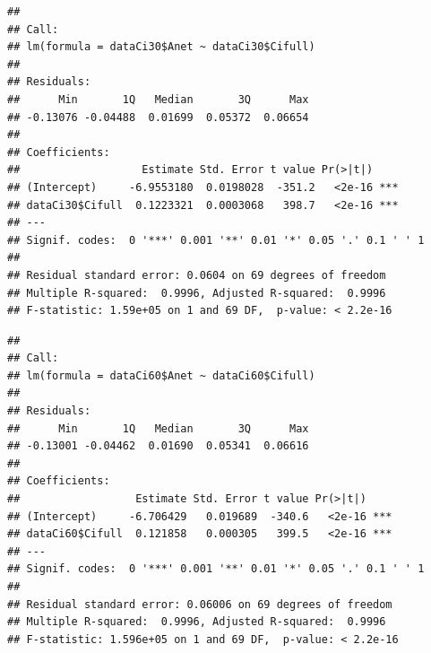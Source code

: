 \documentclass[
]{krantz}
\makeatletter
\newenvironment{Shaded}{\begin{snugshade}}{\end{snugshade}}
\newcommand{\CommentTok}[1]{\textcolor[rgb]{0.56,0.35,0.01}{\textit{#1}}}
\newcommand{\DecValTok}[1]{\textcolor[rgb]{0.00,0.00,0.81}{#1}}
\newcommand{\FunctionTok}[1]{\textcolor[rgb]{0.00,0.00,0.00}{#1}}
\newcommand{\NormalTok}[1]{#1}
\newcommand{\OtherTok}[1]{\textcolor[rgb]{0.56,0.35,0.01}{#1}}
\newcommand{\SpecialCharTok}[1]{\textcolor[rgb]{0.00,0.00,0.00}{#1}}
\newenvironment{kframe}{%
\medskip{}
\setlength{\fboxsep}{.8em}
 \def\at@end@of@kframe{}%
 \ifinner\ifhmode%
  \def\at@end@of@kframe{\end{minipage}}%
  \begin{minipage}{\columnwidth}%
 \fi\fi%
 \def\FrameCommand##1{\hskip\@totalleftmargin \hskip-\fboxsep
 \colorbox{shadecolor}{##1}\hskip-\fboxsep
     \hskip-\linewidth \hskip-\@totalleftmargin \hskip\columnwidth}%
 \MakeFramed {\advance\hsize-\width
   \@totalleftmargin\z@ \linewidth\hsize
   \@setminipage}}%
 {\par\unskip\endMakeFramed%
 \at@end@of@kframe}
\renewenvironment{Shaded}{\begin{kframe}}{\end{kframe}}
\makeatother
\begin{document}
\begin{verbatim}
## 
## Call:
## lm(formula = dataCi30$Anet ~ dataCi30$Cifull)
## 
## Residuals:
##      Min       1Q   Median       3Q      Max 
## -0.13076 -0.04488  0.01699  0.05372  0.06654 
## 
## Coefficients:
##                   Estimate Std. Error t value Pr(>|t|)    
## (Intercept)     -6.9553180  0.0198028  -351.2   <2e-16 ***
## dataCi30$Cifull  0.1223321  0.0003068   398.7   <2e-16 ***
## ---
## Signif. codes:  0 '***' 0.001 '**' 0.01 '*' 0.05 '.' 0.1 ' ' 1
## 
## Residual standard error: 0.0604 on 69 degrees of freedom
## Multiple R-squared:  0.9996, Adjusted R-squared:  0.9996 
## F-statistic: 1.59e+05 on 1 and 69 DF,  p-value: < 2.2e-16
\end{verbatim}

\begin{Shaded}
\end{Shaded}

\begin{verbatim}
## 
## Call:
## lm(formula = dataCi60$Anet ~ dataCi60$Cifull)
## 
## Residuals:
##      Min       1Q   Median       3Q      Max 
## -0.13001 -0.04462  0.01690  0.05341  0.06616 
## 
## Coefficients:
##                  Estimate Std. Error t value Pr(>|t|)    
## (Intercept)     -6.706429   0.019689  -340.6   <2e-16 ***
## dataCi60$Cifull  0.121858   0.000305   399.5   <2e-16 ***
## ---
## Signif. codes:  0 '***' 0.001 '**' 0.01 '*' 0.05 '.' 0.1 ' ' 1
## 
## Residual standard error: 0.06006 on 69 degrees of freedom
## Multiple R-squared:  0.9996, Adjusted R-squared:  0.9996 
## F-statistic: 1.596e+05 on 1 and 69 DF,  p-value: < 2.2e-16
\end{verbatim}

\begin{Shaded}
\end{Shaded}
\end{document}
